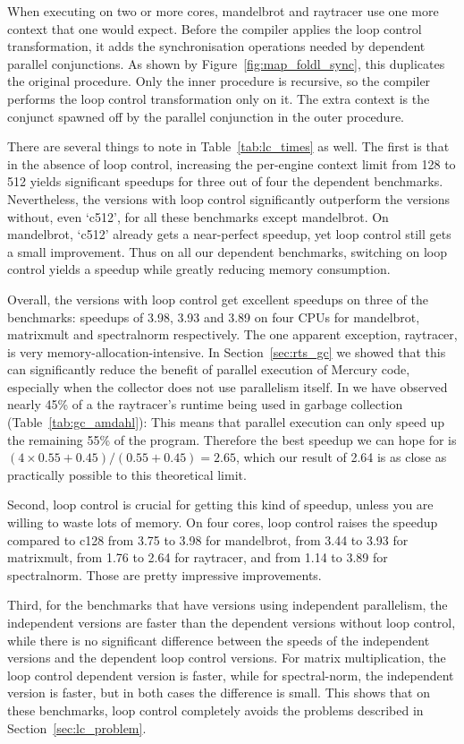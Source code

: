 When executing on two or more cores,
mandelbrot and raytracer use one more context that one would expect.
Before the compiler applies the loop control transformation,
it adds the synchronisation operations
needed by dependent parallel conjunctions.
As shown by Figure~\ref{fig:map_foldl_sync},
this duplicates the original procedure.
Only the inner procedure is recursive,
so the compiler performs the loop control transformation only on it.
The extra context is
the conjunct spawned off by the parallel conjunction in the outer procedure.

There are several things to note in Table~\ref{tab:lc_times} as well.
The first is that in the absence of loop control,
increasing the per-engine context limit from 128 to 512
yields significant speedups for three out of four the dependent benchmarks.
Nevertheless, the versions with loop control
significantly outperform the versions without, even `c512',
for all these benchmarks except mandelbrot.
On mandelbrot, `c512' already gets a near-perfect speedup,
yet loop control still gets a small improvement.
Thus on all our dependent benchmarks,
switching on loop control yields a speedup
while greatly reducing memory consumption.

Overall, the versions with loop control
get excellent speedups on three of the benchmarks:
speedups of 3.98, 3.93 and 3.89 on four CPUs
for mandelbrot, matrixmult and spectralnorm respectively.
The one apparent exception, raytracer,
is very memory-allocation-intensive.
In Section~\ref{sec:rts_gc} we showed that this can significantly reduce the
benefit of parallel execution of Mercury code,
especially when the collector does not use parallelism itself.
In we have observed nearly 45\% of a the raytracer's
runtime being used in garbage collection (Table~\ref{tab:gc_amdahl}):
This means that parallel execution can only speed up the remaining 55\% of
the program.
Therefore the best speedup we can hope for is
$(4 \times 0.55 + 0.45)/(0.55 + 0.45) = 2.65$,
which our result of 2.64 is as close as practically possible to this
theoretical limit.

Second,
loop control is crucial for getting this kind of speedup,
unless you are willing to waste lots of memory.
On four cores, loop control raises the speedup compared to c128
from 3.75 to 3.98 for mandelbrot,
from 3.44 to 3.93 for matrixmult,
from 1.76 to 2.64 for raytracer,
and from 1.14 to 3.89 for spectralnorm.
Those are pretty impressive improvements.

Third, for the benchmarks that have versions using independent parallelism,
the independent versions are faster than
the dependent versions without loop control,
while there is no significant difference between
the speeds of the independent versions and the dependent loop control versions.
For matrix multiplication, the loop control dependent version is faster,
while for spectral-norm, the independent version is faster,
but in both cases the difference is small.
This shows that on these benchmarks, loop control completely avoids
the problems described in Section~\ref{sec:lc_problem}.

